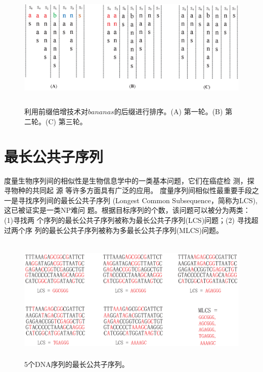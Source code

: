 \begin{figure}[!h]
  \centering
  \includegraphics[height=6cm ,width=15cm]{figures/1_Introduction/Prefix_Doubling.eps}
  \caption{利用前缀倍增技术对$bananas$的后缀进行排序。(A) 第一轮。(B) 第二轮。(C) 第三轮。}
  \label{fig:Prefix_Doubling}
\end{figure}




\section{最长公共子序列}

度量生物序列间的相似性是生物信息学中的一类基本问题，它们在癌症检
测\cite{Aravanis2017,Chattopadhyay2016,Munday2017}，探寻物种的共同起
源 \cite{Zvelebil2007,Perry2015,Donnell2015} 等许多方面具有广泛的应用。
度量序列间相似性最重要手段之一是寻找序列间的最长公共子序列 (Longest
Common Subsequence，简称为LCS), 这已被证实是一类NP难问
题\cite{Maier1978}。根据目标序列的个数，该问题可以被分为两类：(1)寻找两
个序列的最长公共子序列被称为最长公共子序列(LCS)问题；(2) 寻找超过两个序
列的最长公共子序列被称为多最长公共子序列(MLCS)问题。


\begin{figure}[!h]
  \centering
  \includegraphics[height=6cm ,width=15cm]{figures/1_Introduction/MLCS.eps}
  \caption{5个DNA序列的最长公共子序列。}
  \label{fig:MLCS}
\end{figure}


